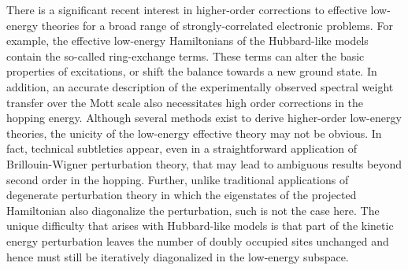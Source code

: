 \documentclass[floatfix,twocolumn,aps,prb,showpacs,superscriptaddress]{revtex4}
\begin{document}
There is a significant recent interest in higher-order corrections to
effective low-energy theories for a broad range of strongly-correlated
electronic problems.\cite{Hemerle:2003,coldea,Lannert,Sandvik} For example,
the effective low-energy Hamiltonians of the Hubbard-like models contain the
so-called ring-exchange terms.\cite{Girvin:1989,Takahashi:1977} These terms
can alter the basic properties of excitations,\cite{Lannert} or shift the
balance towards a new ground state.\cite{Sandvik} In addition, an
accurate description 
of the experimentally observed\cite{Experiments} spectral weight
transfer over the Mott scale also necessitates high order corrections
in the hopping energy.\cite{Eskes:1994,Harris:1967} Although several
methods exist to derive higher-order low-energy theories, the unicity of the
low-energy effective theory may not be obvious.  In fact, technical
subtleties appear, even in a straightforward application of
Brillouin-Wigner perturbation theory, that may lead to ambiguous
results\cite{Su} beyond second order in the hopping.    Further,
unlike traditional applications of degenerate perturbation theory in
which the eigenstates of the projected Hamiltonian also diagonalize
the perturbation, such is not the case here.\cite{pgs} The unique
difficulty that arises with Hubbard-like models is that part of the
kinetic energy perturbation leaves the number of doubly occupied sites
unchanged and hence must still be iteratively diagonalized in the
low-energy subspace. 
\end{document}
